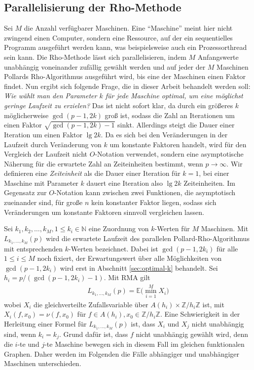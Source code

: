 \documentclass[a4paper, 10pt, ngerman]{article}
\newcommand{\E}{\mathbb{E}}
\newcommand{\N}{\mathbb{N}}
\newcommand{\Z}{\mathbb{Z}}
\begin{document}
\subsection{Parallelisierung der Rho-Methode}

Sei $M$ die Anzahl verfügbarer Maschinen. Eine "`Maschine"'  meint hier nicht zwingend einen Computer, sondern eine Ressource, auf der ein sequentielles Programm ausgeführt werden kann, was beispielsweise auch ein Prozessorthread sein kann. Die Rho-Methode lässt sich parallelisieren, indem $M$ Anfangswerte unabhängig voneinander zufällig gewählt werden und auf jeder der $M$ Maschinen Pollards Rho-Algorithmus ausgeführt wird, bis eine der Maschinen einen Faktor findet. Nun ergibt sich folgende Frage, die in dieser Arbeit behandelt werden soll: \emph{Wie wählt man den Parameter $k$ für jede Maschine optimal, um eine möglichst geringe Laufzeit zu erzielen?} Das ist nicht sofort klar, da durch ein größeres $k$ möglicherweise $\gcd(p - 1, 2k)$ groß ist, sodass die Zahl an Iterationen um einen Faktor $\sqrt{\gcd(p - 1, 2k) -1}$ sinkt. Allerdings steigt die Dauer einer Iteration um einen Faktor $\lg 2k$. Da es sich bei den Veränderungen in der Laufzeit durch Veränderung von $k$ um konstante Faktoren handelt, wird für den Vergleich der Laufzeit nicht $O$-Notation verwendet, sondern eine asymptotische Näherung für die erwartete Zahl an Zeiteinheiten bestimmt, wenn $p \to \infty$. Wir definieren eine \emph{Zeiteinheit} als die Dauer einer Iteration für $k = 1$, bei einer Maschine mit Parameter $k$ dauert eine Iteration also $\lg 2k$ Zeiteinheiten. Im Gegensatz zur $O$-Notation kann zwischen zwei Funktionen, die asymptotisch zueinander sind, für große $n$ kein konstanter Faktor liegen, sodass sich Veränderungen um konstante Faktoren sinnvoll vergleichen lassen.

Sei $k_1, k_2, \dots, k_M, 1 \le k_i \in \N$ eine Zuordnung von $k$-Werten für $M$ Maschinen. Mit $L_{k_1, \dots, k_M}(p)$ wird die erwartete Laufzeit des parallelen Pollard-Rho-Algorithmus mit entsprechenden $k$-Werten bezeichnet. Dabei ist $\gcd(p - 1, 2k_i)$ für alle $1 \le i \le M$ noch fixiert, der Erwartungswert über alle Möglichkeiten von $\gcd(p - 1, 2k_i)$ wird erst in Abschnitt \ref{sec:optimal-k} behandelt. Sei $h_i = p/(\gcd(p - 1, 2k_i) - 1)$. Mit RMA gilt
\begin{align}
    L_{k_1, \dots, k_M}(p) = \E \bigg ( \min_{i = 1}^M X_i \bigg )
    \label{lk-definition}
\end{align}
wobei $X_i$ die gleichverteilte Zufallsvariable über $A(h_i) \times \Z/h_i\Z$ ist, mit $X_i(f, x_0) = \nu(f, x_0)$ für $f \in A(h_i), x_0 \in \Z/h_i\Z$. Eine Schwierigkeit in der Herleitung einer Formel für $L_{k_1, \dots, k_M}(p)$ ist, dass $X_i$ und $X_j$ nicht unabhängig sind, wenn $k_i = k_j$. Grund dafür ist, dass $f$ nicht unabhängig gewählt wird, denn die $i$-te und $j$-te Maschine bewegen sich in diesem Fall im gleichen funktionalen Graphen.  Daher werden im Folgenden die Fälle abhängiger und unabhängiger Maschinen unterschieden.
\end{document}
